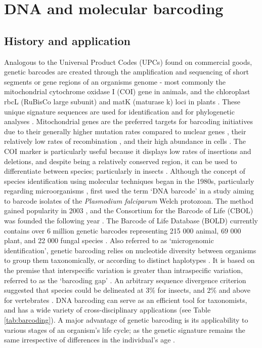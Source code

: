 \section{DNA and molecular barcoding}

\subsection{History and application}

Analogous to the Universal Product Codes (UPCs) found on commercial goods, genetic barcodes are created through the amplification and sequencing of short segments or gene regions of an organism\textsc{}s genome - most commonly the mitochondrial cytochrome oxidase I (COI) gene in animals, and the chloroplast rbcL (RuBisCo large subunit) and matK (maturase k) loci in plants \citep{Hebert2003, CBOL2009, Floyd2010}. These unique signature sequences are used for identification and for phylogenetic analyses \citep{Hebert2003}. Mitochondrial genes are the preferred targets for barcoding initiatives due to their generally higher mutation rates compared to nuclear genes \citep{Drake1998, Ballard2004, Haag-Liautard2008}, their relatively low rates of recombination \citep{Piganeau2004}, and their high abundance in cells \citep{Waugh2007}. The COI marker is particularly useful because it displays low rates of insertions and deletions, and despite being a relatively conserved region, it can be used to differentiate between species; particularly in insects \citep{Hebert2003, Blaxter2004}. 
Although the concept of species identification using molecular techniques began in the 1980s, particularly regarding microorganisms \citep{Nanney1982, McAndrew1983, Anderson1985}, \citet{Arnot1993} first used the term `DNA barcode' in a study aiming to barcode isolates of the \textit{Plasmodium falciparum} Welch protozoan. The method gained popularity in 2003 \citep{Hebert2003, Hebert2003a}, and the Consortium for the Barcode of Life (CBOL) was founded the following year \citep{CBOL2009}. The Barcode of Life Database (BOLD) currently contains over 6 million genetic barcodes representing 215 000 animal, 69 000 plant, and 22 000 fungal species \citep{BOLD2019}.
Also referred to as `microgenomic identification', genetic barcoding relies on nucleotide diversity between organisms to group them taxonomically, or according to distinct haplotypes \citep{Hebert2003a}. It is based on the premise that interspecific variation is greater than intraspecific variation, referred to as the `barcoding gap' \citep{Hebert2003}. An arbitrary sequence divergence criterion suggested that species could be delineated at 3\% for insects, and 2\% and above for vertebrates \citep{Hebert2003}. 
DNA barcoding can serve as an efficient tool for taxonomists, and has a wide variety of cross-disciplinary applications \citep{Savolainen2005, Frezal2008, Valentini2008} (see Table \ref{tab:barcoding}).
A major advantage of genetic barcoding is its applicability to various stages of an organism's life cycle; as the genetic signature remains the same irrespective of differences in the individual's age \citep{Floyd2010}. 


